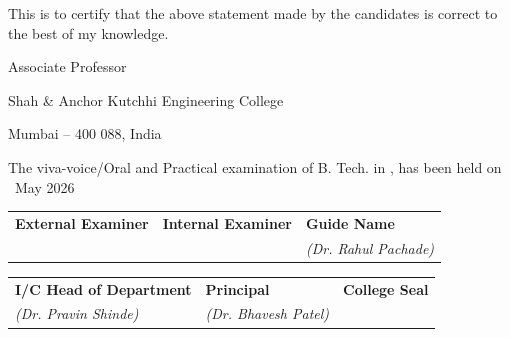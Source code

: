 \textsc{}{This is to certify that the above statement made by the candidates is correct to the best of my knowledge.}\par
\vspace{0.5\baselineskip}
{\mysupervisor} \par
{Associate Professor \par \mydep \par Shah \& Anchor Kutchhi Engineering College \par Mumbai -- 400 088, India}


\vspace{0.5\baselineskip}

{The viva-voice/Oral and Practical examination of B. Tech. in \branch,
has been held on \ May 2026}

\vspace{2\baselineskip}

\begin{tabular}{p{}p{}p{}}
\textbf{External Examiner} & \textbf{Internal Examiner} & \textbf{Guide Name}\\
\textit{} & \textit{} & \textit{(Dr. Rahul Pachade)}
\end{tabular}

\vspace{2\baselineskip}

\begin{tabular}{p{} p{} p{}}
    \textbf{I/C Head of Department} & \textbf{  Principal} & \textbf{College Seal} \\
    \textit{(Dr. Pravin Shinde)} & \textit{(Dr. Bhavesh Patel)} & \textit{}
\end{tabular}



\bigskip